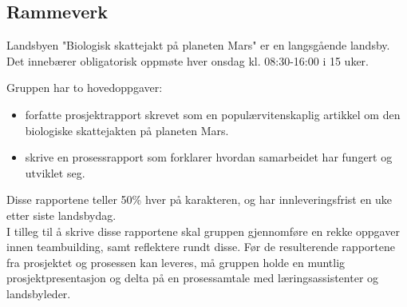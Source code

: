 \subsection{Rammeverk}

Landsbyen "Biologisk skattejakt på planeten Mars" er en langsgående landsby.
Det innebærer obligatorisk oppmøte hver onsdag kl. 08:30-16:00 i 15 uker.

Gruppen har to hovedoppgaver:
\begin{itemize}
\item forfatte prosjektrapport skrevet som en populærvitenskaplig artikkel om den biologiske skattejakten på planeten Mars.
\item skrive en prosessrapport som forklarer hvordan samarbeidet har fungert og utviklet seg.
\end{itemize}
Disse rapportene teller 50\% hver på karakteren, og har innleveringsfrist en uke etter siste landsbydag.
\\
I tilleg til å skrive disse rapportene skal gruppen gjennomføre en rekke oppgaver innen teambuilding, samt reflektere rundt disse.
Før de resulterende rapportene fra prosjektet og prosessen kan leveres, må gruppen holde en muntlig prosjektpresentasjon og delta på en prosessamtale med læringsassistenter og landsbyleder.